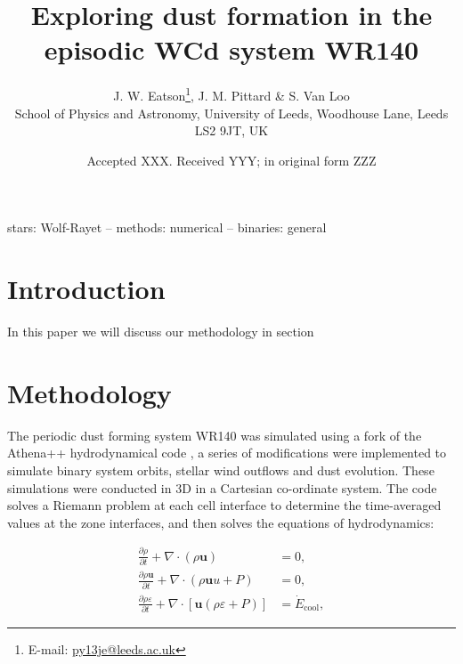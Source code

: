 \documentclass[fleqn,usenatbib]{mnras}
\title[Hydrodynamical Simulation of WR140]{Exploring dust formation in the episodic WCd system WR140}
\author[J. W. Eatson et al.]{
J. W. Eatson\thanks{E-mail: \href{mailto:py13je@leeds.ac.uk}{py13je@leeds.ac.uk}},
J. M. Pittard \&
S. Van Loo
\\
School of Physics and Astronomy, University of
       Leeds, Woodhouse Lane, Leeds LS2 9JT, UK\\  
}
\date{Accepted XXX. Received YYY; in original form ZZZ}
\begin{document}
\label{firstpage}
\pagerange{\pageref{firstpage}--\pageref{lastpage}}
\maketitle

\begin{abstract}
\noindent


\end{abstract}

\begin{keywords}
stars: Wolf-Rayet -- methods: numerical -- binaries: general
\end{keywords}



\section{Introduction}



In this paper we will discuss our methodology in section 

\section{Methodology}
\label{sec:paper-2-methodology}


The periodic dust forming system WR140 was simulated using a fork of the Athena++ hydrodynamical code \citep{stoneAthenaAdaptiveMesh2020}, a series of modifications were implemented to simulate binary system orbits, stellar wind outflows and dust evolution.
These simulations were conducted in 3D in a Cartesian co-ordinate system.
The code solves a Riemann problem at each cell interface to determine the time-averaged values at the zone interfaces, and then solves the equations of hydrodynamics:

\begin{subequations}
  \begin{align}
    \frac{\partial\rho}{\partial t}+\nabla \cdot \left(\rho \boldsymbol{u}\right) & = 0 , \\
    \frac{\partial \rho \boldsymbol{u}}{\partial t} + \nabla \cdot \left(\rho \boldsymbol{u} u + P \right) & = 0, \\
    \frac{\partial \rho \varepsilon}{\partial t} + \nabla \cdot \left[ \boldsymbol{u} \left( \rho\varepsilon + P \right) \right] & = \dot E_\text{cool} , 
  \end{align}
\end{subequations}
\end{document}
